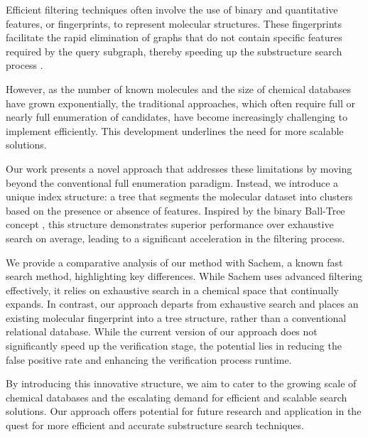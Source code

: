 Efficient filtering techniques often involve the use of binary and quantitative features, or fingerprints, to represent molecular 
structures. These fingerprints facilitate the rapid elimination of graphs that do not contain specific features required by the 
query subgraph, thereby speeding up the substructure search process \cite{bonchi2011, klein2014}.

However, as the number of known molecules and the size of chemical databases have grown exponentially, the traditional approaches, 
which often require full or nearly full enumeration of candidates, have become increasingly challenging to implement efficiently. 
This development underlines the need for more scalable solutions.

Our work presents a novel approach that addresses these limitations by moving beyond the conventional full enumeration paradigm. 
Instead, we introduce a unique index structure: a tree that segments the molecular dataset into clusters based on the presence or 
absence of features. Inspired by the binary Ball-Tree concept \cite{omohundro1989, clarkson1994}, this structure demonstrates 
superior performance over exhaustive search on average, leading to a significant acceleration in the filtering process.

We provide a comparative analysis of our method with Sachem, a known fast search method, highlighting key differences. While Sachem 
uses advanced filtering effectively, it relies on exhaustive search in a chemical space that continually expands. In contrast, 
our approach departs from exhaustive search and places an existing molecular fingerprint into a tree structure, rather than a 
conventional relational database. While the current version of our approach does not significantly speed up the verification 
stage, the potential lies in reducing the false positive rate and enhancing the verification process runtime.

By introducing this innovative structure, we aim to cater to the growing scale of chemical databases and the escalating demand 
for efficient and scalable search solutions. Our approach offers potential for future research and application in the quest 
for more efficient and accurate substructure search techniques.

